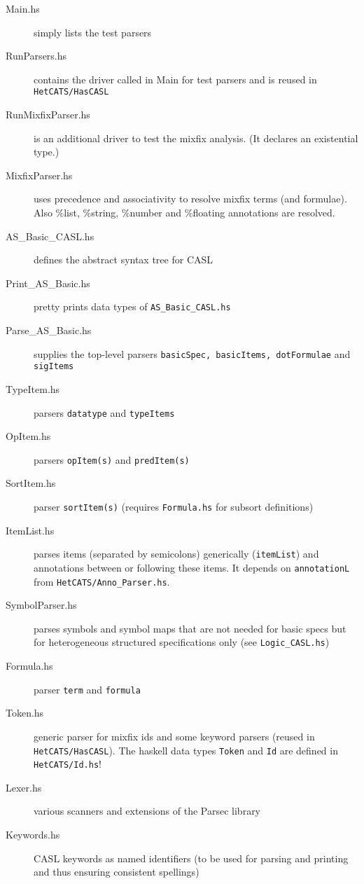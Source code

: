\documentclass{article}
\begin{document}
\begin{description}
\item[Main.hs] simply lists the test parsers 
\item[RunParsers.hs] contains the driver called in Main for test parsers and is reused in \texttt{HetCATS/HasCASL}
\item[RunMixfixParser.hs] is an additional driver to test the mixfix
  analysis. (It declares an existential type.)
\item[MixfixParser.hs] uses precedence and associativity to resolve
  mixfix terms (and formulae). Also \%list, \%string, \%number and
  \%floating annotations are resolved. 
\item[AS\_Basic\_CASL.hs] defines the abstract syntax tree for CASL
\item[Print\_AS\_Basic.hs] pretty prints data types of
  \texttt{AS\_Basic\_CASL.hs}
\item[Parse\_AS\_Basic.hs] supplies the top-level parsers \texttt{basicSpec,
  basicItems, dotFormulae} and \texttt{sigItems}
\item[TypeItem.hs] parsers \texttt{datatype} and \texttt{typeItems}
\item[OpItem.hs] parsers \texttt{opItem(s)} and \texttt{predItem(s)}
\item[SortItem.hs] parser \texttt{sortItem(s)} (requires \texttt{Formula.hs} for subsort definitions)
\item[ItemList.hs] parses items (separated by semicolons) generically
  (\texttt{itemList}) and annotations between or following these
  items. It depends on \texttt{annotationL} from
  \texttt{HetCATS/Anno\_Parser.hs}.
\item[SymbolParser.hs] parses symbols and symbol maps that are not
  needed for basic specs but for heterogeneous structured
  specifications only (see \texttt{Logic\_CASL.hs})
\item[Formula.hs] parser \texttt{term} and \texttt{formula}
\item[Token.hs] generic parser for mixfix ids and some keyword parsers
  (reused in \texttt{HetCATS/HasCASL}). The haskell data types
  \texttt{Token} and \texttt{Id} are defined in \texttt{HetCATS/Id.hs}!
\item[Lexer.hs] various scanners and extensions of the Parsec library 
\item[Keywords.hs] CASL keywords as named identifiers (to be used
  for parsing and printing and thus ensuring consistent spellings)
\end{description}
\end{document}
